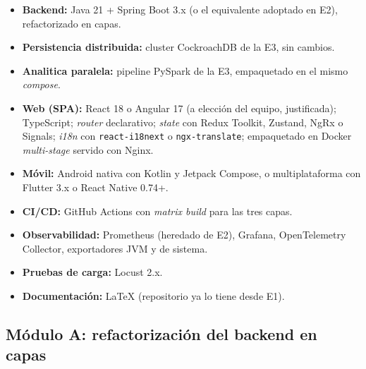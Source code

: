 \documentclass[11pt,a4paper]{article}
\begin{document}
    \begin{utqbox}[title={Stack obligatorio para E4}]
        \small
        \begin{itemize}
            \item \textbf{Backend:} Java 21 + Spring Boot 3.x (o el equivalente adoptado en E2), refactorizado en capas.
            \item \textbf{Persistencia distribuida:} cluster CockroachDB de la E3, sin cambios.
            \item \textbf{Analitica paralela:} pipeline PySpark de la E3, empaquetado en el mismo \textit{compose}.
            \item \textbf{Web (SPA):} React 18 o Angular 17 (a elección del equipo, justificada); TypeScript; \textit{router} declarativo; \textit{state} con Redux Toolkit, Zustand, NgRx o Signals; \textit{i18n} con \texttt{react-i18next} o \texttt{ngx-translate}; empaquetado en Docker \textit{multi-stage} servido con Nginx.
            \item \textbf{Móvil:} Android nativa con Kotlin y Jetpack Compose, o multiplataforma con Flutter 3.x o React Native 0.74+.
            \item \textbf{CI/CD:} GitHub Actions con \textit{matrix build} para las tres capas.
            \item \textbf{Observabilidad:} Prometheus (heredado de E2), Grafana, OpenTelemetry Collector, exportadores JVM y de sistema.
            \item \textbf{Pruebas de carga:} Locust 2.x.
            \item \textbf{Documentación:} LaTeX (repositorio ya lo tiene desde E1).
        \end{itemize}
    \end{utqbox}

\subsection{Módulo A: refactorización del backend en capas}
\end{document}
